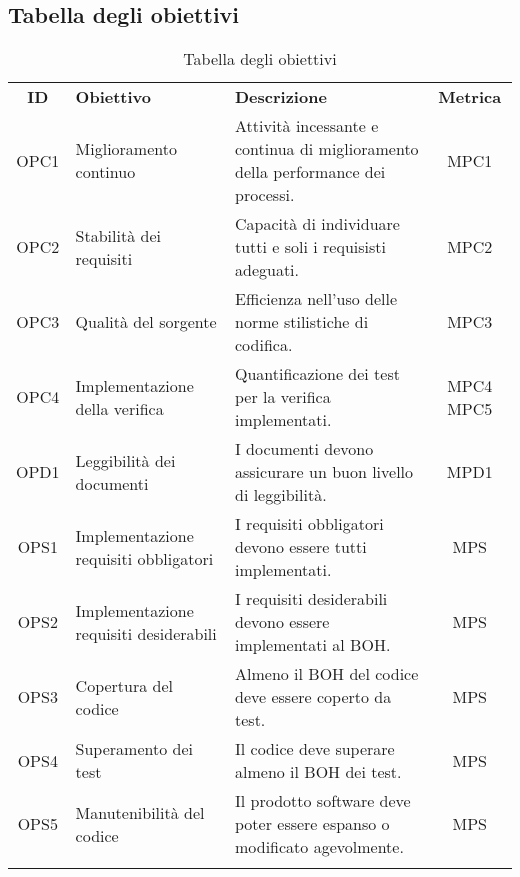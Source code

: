 \subsection{Tabella degli obiettivi}

\begin{longtable}{| c | p{5cm} | p{5cm} | c |}
	\rowcolor{LightBlue}
	\color{white}\bfseries ID & \color{white}\bfseries Obiettivo & \color{white}\bfseries Descrizione & \color{white}\bfseries Metrica \\[0.25cm]
	OPC1 & Miglioramento continuo & Attività incessante e continua di miglioramento della performance dei processi. & MPC1 \\ \hline
	OPC2 & Stabilità dei requisiti & Capacità di individuare tutti e soli i requisisti adeguati. & MPC2 \\ \hline
	OPC3 & Qualità del sorgente & Efficienza nell'uso delle norme stilistiche di codifica. & MPC3 \\ \hline
	OPC4 & Implementazione della verifica & Quantificazione dei test per la verifica implementati. & MPC4 MPC5 \\ \hline
	OPD1 & Leggibilità dei documenti & I documenti devono assicurare un buon livello di leggibilità. & MPD1 \\ \hline
	OPS1 & Implementazione requisiti obbligatori & I requisiti obbligatori devono essere tutti implementati. & MPS \\ \hline
	OPS2 & Implementazione requisiti desiderabili & I requisiti desiderabili devono essere implementati al BOH. & MPS \\ \hline
	OPS3 & Copertura del codice & Almeno il BOH del codice deve essere coperto da test. & MPS \\ \hline
	OPS4 & Superamento dei test & Il codice deve superare almeno il BOH dei test. & MPS \\ \hline
	OPS5 & Manutenibilità del codice & Il prodotto software deve poter essere espanso o modificato agevolmente. & MPS \\ \hline 
	\caption{Tabella degli obiettivi} 
\end{longtable}